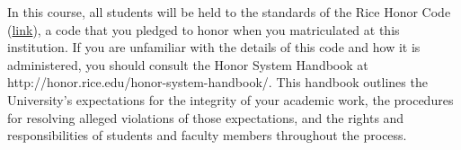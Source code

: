 \documentclass[10pt]{article}
\begin{document}
In this course, all students will be held to the standards of the Rice Honor Code (\href{https://cpb-us-e1.wpmucdn.com/blogs.rice.edu/dist/c/490/files/2022/08/Honor-Council-Standard-Definitions-and-Policies.pdf}{link}),
a code that you pledged to honor when you matriculated at this institution. If you are unfamiliar with the details of this code and how it is administered, you should consult the Honor System Handbook at
http://honor.rice.edu/honor-system-handbook/. This handbook outlines the University’s expectations for the integrity of your academic work, the procedures for resolving alleged violations of those expectations,
and the rights and responsibilities of students and faculty members throughout the process.

\end{document}
